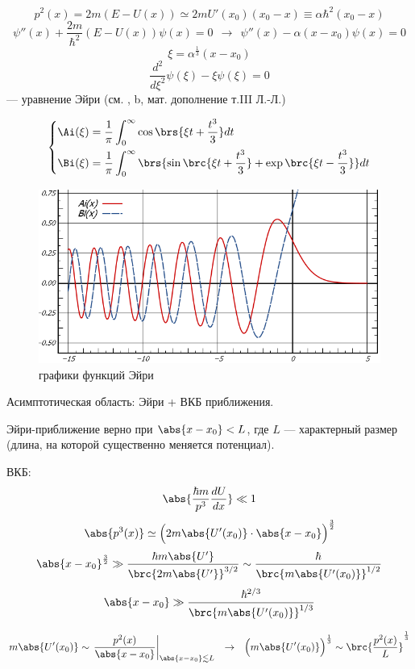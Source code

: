 $$
p^2(x) = 2m(E-U(x)) \simeq 2m U'(x_0)(x_0 - x) \equiv \alpha \hbar^2 (x_0 - x)
$$
$$
\psi''(x) + \frac{2m}{\hbar^2} (E-U(x)) \psi(x) = 0 ~~\rightarrow~~ \psi''(x) - \alpha(x-x_0) \psi(x) = 0
$$
$$
\xi = \alpha^{\frac{1}{3}} (x-x_0)
$$
$$
\boxed{
	\frac{d^2}{d\xi^2}\psi(\xi) - \xi\psi(\xi) = 0
}
$$
--- уравнение Эйри (см. , \textsection b, мат. дополнение т.III Л.-Л.)

$$
\left\{
\begin{aligned}
\Ai(\xi) &= \frac{1}{\pi} \int_0^\infty \cos\brs{\xi t + \frac{t^3}{3}} dt \\
\Bi(\xi) &= \frac{1}{\pi} \int_0^\infty \brs{ \sin\brc{\xi t + \frac{t^3}{3}} + \exp\brc{\xi t - \frac{t^3}{3}} } dt
\end{aligned}
\right.
$$

\begin{figure}[h]
\centering
\includegraphics[scale=0.4]{figs/11_2}
\caption{графики функций Эйри}
\label{fig:11_2}
\end{figure}

Асимптотическая область: Эйри + ВКБ приближения.

Эйри-приближение верно при $\abs{x-x_0} < L$, где $L$ --- характерный размер (длина, на которой существенно меняется потенциал).

ВКБ:
$$
\abs{\frac{\hbar m}{p^3} \frac{dU}{dx}} \ll 1
$$
$$
\abs{p^3(x)} \simeq \Bigl( 2m \abs{U'(x_0)} \cdot \abs{x-x_0} \Bigr)^{\frac{3}{2}}
$$
$$
\abs{x-x_0}^{\frac{3}{2}} \gg \frac{\hbar m \abs{U'}}{\brc{2m \abs{U'}}^{3/2}} \sim \frac{\hbar}{\brc{m \abs{U'(x_0)}}^{1/2}}
$$
\begin{equation}
\label{eq:11_2_1}
\abs{x-x_0} \gg \frac{\hbar^{2/3}}{\brc{m \abs{U'(x_0)}}^{1/3}}
\end{equation}

$$
m \abs{U'(x_0)} \sim \left. \frac{p^2(x)}{\abs{x-x_0}} \right|_{\abs{x-x_0} \lesssim L} ~~\rightarrow~~
\Bigl( m\abs{U'(x_0)} \Bigr)^{\frac{1}{3}} \sim \brc{\frac{p^2(x)}{L}}^{\frac{1}{3}}
$$

